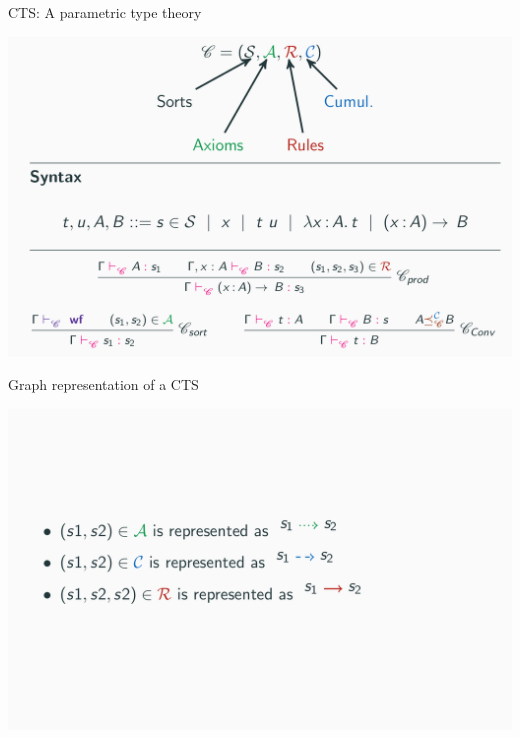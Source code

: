 \documentclass[usenames, dvipsnames]{beamer}
\begin{document}
\begin{frame}{CTS: A parametric type theory}
  \begin{center}    
    \includegraphics[scale=0.2]{images/cts.png}
  \end{center}    
\end{frame}

\begin{frame}{Graph representation of a CTS}
  \begin{center}    
    \includegraphics[scale=0.2]{images/graph.png}
  \end{center}    
\end{frame}
\end{document}
